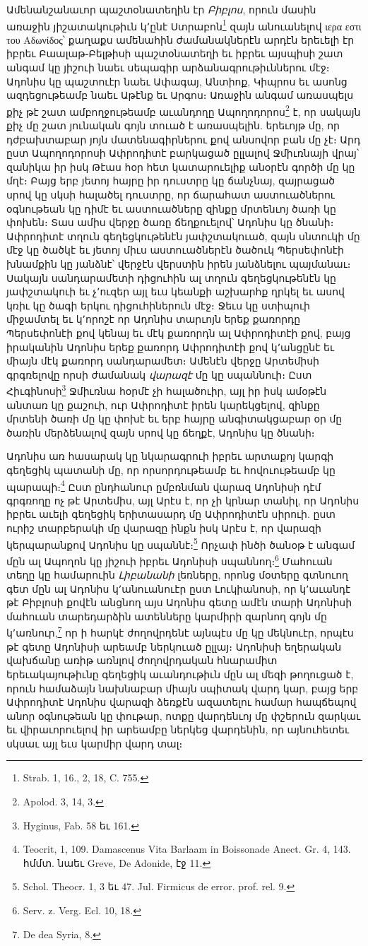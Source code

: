 \documentclass{article}
\begin{document}
{Ամենանշանաւոր պաշտօնատեղին էր \emph{Բիբլոս}, որուն մասին առաջին յիշատակութիւն կ՚ընէ Ստրաբոն\footnote{Strab. 1, 16., 2, 18, C. 755.} զայն անուանելով ιερα εστι του Αδωνίδος՝ քաղաքս ամենահին ժամանակներէն արդէն երեւելի էր իբրեւ Բաալաթ֊Բելթիսի պաշտօնատեղի եւ իբրեւ այսպիսի շատ անգամ կը յիշուի նաեւ սեպագիր արձանագրութիւններու մէջ։ Ադոնիս կը պաշտուէր նաեւ Ափագայ, Անտիոք, Կիպրոս եւ ասոնց ազդեցութեամբ նաեւ Աթէնք եւ Արգոս։ Առաջին անգամ առասպելս քիչ թէ շատ ամբողջութեամբ աւանդողը Ապողոդորոս\footnote{Apolod. 3, 14, 3.} է, որ սակայն քիչ մը շատ յունական գոյն տուած է առասպելին. երեւոյթ մը, որ դժբախտաբար յոյն մատենագիրներու քով անսովոր բան մը չէ։ Արդ ըստ Ապողոդորոսի Ափրոդիտէ բարկացած ըլլալով Ջմիւռնայի վրայ՝ զանիկա իր իսկ Թէաս հօր հետ կատարուելիք անօրէն գործի մը կը մղէ։ Բայց երբ յետոյ հայրը իր դուստրը կը ճանչնայ, զայրացած սրով կը սկսի հալածել դուստրը, որ ճարահատ աստուածներու օգնութեան կը դիմէ եւ աստուածները զինքը մրտենւոյ ծառի կը փոխեն։ Տաս ամիս վերջը ծառը ճեղքուելով՝ Ադոնիս կը ծնանի։ Ափրոդիտէ տղուն գեղեցկութենէն յափշտակուած, զայն սնտուկի մը մէջ կը ծածկէ եւ յետոյ միւս աստուածներէն ծածուկ Պերսեփոնէի խնամքին կը յանձնէ՝ վերջէն վերստին իրեն յանձնելու պայմանաւ։ Սակայն սանդարամետի դիցուհին ալ տղուն գեղեցկութենէն կը յափշտակուի եւ չ՚ուզեր այլ եւս կեանքի աշխարհք ղրկել եւ ասով կռիւ կը ծագի երկու դիցուհիներուն մէջ։ Ջեւս կը ստիպուի միջամտել եւ կ՚որոշէ որ Ադոնիս տարւոյն երեք քառորդը Պերսեփոնէի քով կենայ եւ մէկ քառորդն ալ Ափրոդիտէի քով, բայց իրականին Ադոնիս երեք քառորդ Ափրոդիտէի քով կ՚անցընէ եւ միայն մէկ քառորդ սանդարամետ։ Ամենէն վերջը Արտեմիսի գրգռելովը որսի ժամանակ \emph{վարազէ} մը կը սպաննուի։ Ըստ Հիւգինոսի\footnote{Hyginus, Fab. 58 եւ 161.} Ջմիւռնա հօրմէ չի հալածուիր, այլ իր իսկ ամօթէն անտառ կը քաշուի, ուր Ափրոդիտէ իրեն կարեկցելով, զինքը մրտենի ծառի մը կը փոխէ եւ երբ հայրը անգիտակցաբար օր մը ծառին մերձենալով զայն սրով կը ճեղքէ, Ադոնիս կը ծնանի։

Ադոնիս առ հասարակ կը նկարագրուի իբրեւ արտաքոյ կարգի գեղեցիկ պատանի մը, որ որսորդութեամբ եւ հովուութեամբ կը պարապի։\footnote{Teocrit, 1, 109. Damascenus Vita Barlaam in Boissonade Anect. Gr. 4, 143. հմմտ. նաեւ Greve, De Adonide, էջ 11.} Ըստ ընդհանուր ըմբռնման վարազ Ադոնիսի դէմ գրգռողը ոչ թէ Արտեմիս, այլ Արէս է, որ չի կրնար տանիլ, որ Ադոնիս իբրեւ աւելի գեղեցիկ երիտասարդ մը Ափրոդիտէն սիրուի. ըստ ուրիշ տարբերակի մը վարազը ինքն իսկ Արէս է, որ վարազի կերպարանքով Ադոնիս կը սպաննէ։\footnote{Schol. Theocr. 1, 3 եւ 47. Jul. Firmicus de error. prof. rel. 9.} Որչափ ինծի ծանօթ է անգամ մըն ալ Ապողոն կը յիշուի իբրեւ Ադոնիսի սպաննող։\footnote{Serv. z. Verg. Ecl. 10, 18.} Մահուան տեղը կը համարուին \emph{Լիբանանի} լեռները, որոնց մօտերը գտնուող գետ մըն ալ Ադոնիս կ՚անուանուէր ըստ Լուկիանոսի, որ կ՚աւանդէ թէ Բիբլոսի քովէն անցնող այս Ադոնիս գետը ամէն տարի Ադոնիսի մահուան տարեդարձին ատենները կարմիրի զարնող գոյն մը կ՚առնուր,\footnote{De dea Syria, 8.} որ ի հարկէ ժողովրդենէ այնպէս մը կը մեկնուէր, որպէս թէ գետը Ադոնիսի արեամբ ներկուած ըլլայ։ Ադոնիսի եղերական վախճանը առիթ առնլով ժողովրդական հնարամիտ երեւակայութիւնը գեղեցիկ աւանդութիւն մըն ալ մեզի թողուցած է, որուն համաձայն նախնաբար միայն սպիտակ վարդ կար, բայց երբ Ափրոդիտէ Ադոնիս վարազի ձեռքէն ազատելու համար հապճեպով անոր օգնութեան կը փութար, ոտքը վարդենւոյ մը փշերուն զարկաւ եւ վիրաւորուելով իր արեամբը ներկեց վարդենին, որ այնուհետեւ սկսաւ այլ եւս կարմիր վարդ տալ։

}
\end{document}
